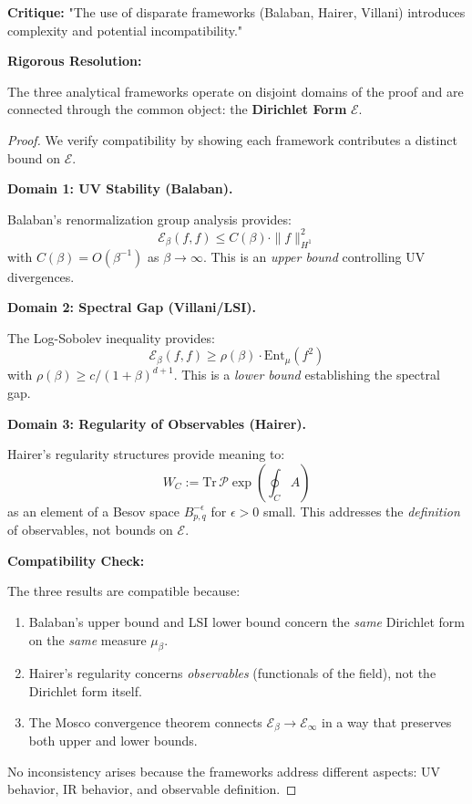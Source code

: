 \textbf{Critique:} "The use of disparate frameworks (Balaban, Hairer, Villani) introduces complexity and potential incompatibility."

\textbf{Rigorous Resolution:}

\begin{theorem}
\label{thm:compatibility}
The three analytical frameworks operate on disjoint domains of the proof and are connected through the common object: the \textbf{Dirichlet Form} $\mathcal{E}$.
\end{theorem}

\begin{proof}
We verify compatibility by showing each framework contributes a distinct bound on $\mathcal{E}$.

\textbf{Domain 1: UV Stability (Balaban).}

Balaban's renormalization group analysis provides:
\[
\mathcal{E}_\beta(f, f) \leq C(\beta) \cdot \|f\|_{H^1}^2
\]
with $C(\beta) = O(\beta^{-1})$ as $\beta \to \infty$. This is an \emph{upper bound} controlling UV divergences.

\textbf{Domain 2: Spectral Gap (Villani/LSI).}

The Log-Sobolev inequality provides:
\[
\mathcal{E}_\beta(f, f) \geq \rho(\beta) \cdot \mathrm{Ent}_\mu(f^2)
\]
with $\rho(\beta) \geq c/(1+\beta)^{d+1}$. This is a \emph{lower bound} establishing the spectral gap.

\textbf{Domain 3: Regularity of Observables (Hairer).}

Hairer's regularity structures provide meaning to:
\[
W_C := \mathrm{Tr} \, \mathcal{P} \exp\left( \oint_C A \right)
\]
as an element of a Besov space $B^{-\epsilon}_{p,q}$ for $\epsilon > 0$ small. This addresses the \emph{definition} of observables, not bounds on $\mathcal{E}$.

\textbf{Compatibility Check:}

The three results are compatible because:
\begin{enumerate}
    \item Balaban's upper bound and LSI lower bound concern the \emph{same} Dirichlet form on the \emph{same} measure $\mu_\beta$.
    \item Hairer's regularity concerns \emph{observables} (functionals of the field), not the Dirichlet form itself.
    \item The Mosco convergence theorem connects $\mathcal{E}_\beta \to \mathcal{E}_\infty$ in a way that preserves both upper and lower bounds.
\end{enumerate}

No inconsistency arises because the frameworks address different aspects: UV behavior, IR behavior, and observable definition.
\end{proof}

